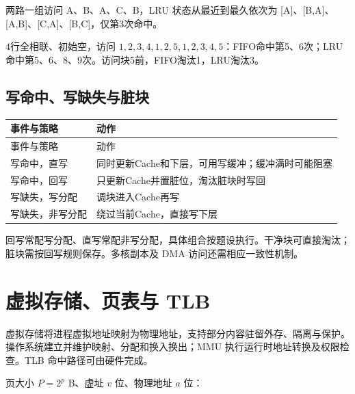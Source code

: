 两路一组访问 A、B、A、C、B，LRU 状态从最近到最久依次为 {[}A{]}、{[}B,A{]}、{[}A,B{]}、{[}C,A{]}、{[}B,C{]}，仅第3次命中。

4行全相联、初始空，访问 \(1,2,3,4,1,2,5,1,2,3,4,5\)：FIFO命中第5、6次；LRU命中第5、6、8、9次。访问块5前，FIFO淘汰1，LRU淘汰3。

\subsection{写命中、写缺失与脏块}\label{CO03-write}

\par\smallskip
{\fontsize{9.3}{12}\selectfont\setlength{\tabcolsep}{2.5pt}\setlength{\LTleft}{0pt}\setlength{\LTright}{0pt}
\begin{longtable}{@{}>{\raggedright\arraybackslash}p{}>{\raggedright\arraybackslash}p{}@{}}
\toprule
事件与策略 & 动作 \\

\midrule\endfirsthead\toprule
事件与策略 & 动作 \\

\midrule\endhead\bottomrule\endfoot
写命中，直写 & 同时更新Cache和下层，可用写缓冲；缓冲满时可能阻塞 \\

写命中，回写 & 只更新Cache并置脏位，淘汰脏块时写回 \\

写缺失，写分配 & 调块进入Cache再写 \\

写缺失，非写分配 & 绕过当前Cache，直接写下层 \\

\end{longtable}}
\par\smallskip

回写常配写分配、直写常配非写分配，具体组合按题设执行。干净块可直接淘汰；脏块需按回写规则保存。多核副本及 DMA 访问还需相应一致性机制。

\section{虚拟存储、页表与 TLB}\label{CO03-virtual}

虚拟存储将进程虚拟地址映射为物理地址，支持部分内容驻留外存、隔离与保护。操作系统建立并维护映射、分配和换入换出；MMU 执行运行时地址转换及权限检查。TLB 命中路径可由硬件完成。

页大小 \(P=2^p\) B、虚址 \(v\) 位、物理地址 \(a\) 位：

